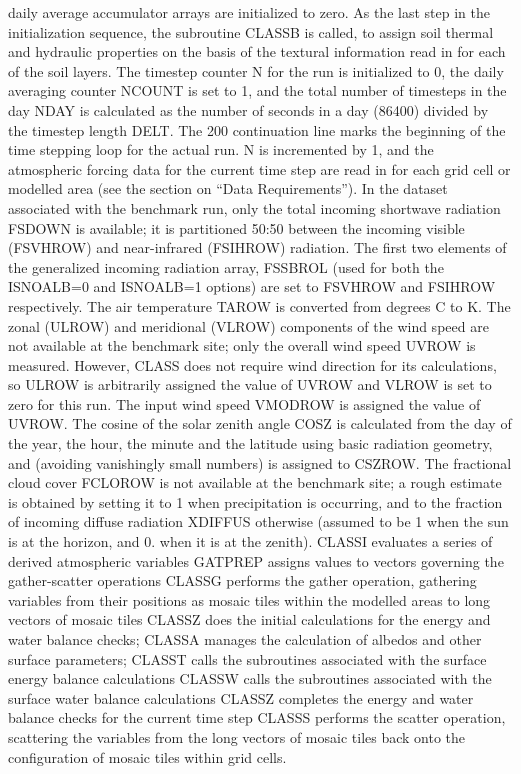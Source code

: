 daily average accumulator arrays are initialized to zero. As the last step in the initialization sequence, the subroutine C\+L\+A\+S\+S\+B is called, to assign soil thermal and hydraulic properties on the basis of the textural information read in for each of the soil layers. The timestep counter N for the run is initialized to 0, the daily averaging counter N\+C\+O\+U\+N\+T is set to 1, and the total number of timesteps in the day N\+D\+A\+Y is calculated as the number of seconds in a day (86400) divided by the timestep length D\+E\+L\+T. The 200 continuation line marks the beginning of the time stepping loop for the actual run. N is incremented by 1, and the atmospheric forcing data for the current time step are read in for each grid cell or modelled area (see the section on “\+Data Requirements”). In the dataset associated with the benchmark run, only the total incoming shortwave radiation F\+S\+D\+O\+W\+N is available; it is partitioned 50\+:50 between the incoming visible (F\+S\+V\+H\+R\+O\+W) and near-\/infrared (F\+S\+I\+H\+R\+O\+W) radiation. The first two elements of the generalized incoming radiation array, F\+S\+S\+B\+R\+O\+L (used for both the I\+S\+N\+O\+A\+L\+B=0 and I\+S\+N\+O\+A\+L\+B=1 options) are set to F\+S\+V\+H\+R\+O\+W and F\+S\+I\+H\+R\+O\+W respectively. The air temperature T\+A\+R\+O\+W is converted from degrees C to K. The zonal (U\+L\+R\+O\+W) and meridional (V\+L\+R\+O\+W) components of the wind speed are not available at the benchmark site; only the overall wind speed U\+V\+R\+O\+W is measured. However, C\+L\+A\+S\+S does not require wind direction for its calculations, so U\+L\+R\+O\+W is arbitrarily assigned the value of U\+V\+R\+O\+W and V\+L\+R\+O\+W is set to zero for this run. The input wind speed V\+M\+O\+D\+R\+O\+W is assigned the value of U\+V\+R\+O\+W. The cosine of the solar zenith angle C\+O\+S\+Z is calculated from the day of the year, the hour, the minute and the latitude using basic radiation geometry, and (avoiding vanishingly small numbers) is assigned to C\+S\+Z\+R\+O\+W. The fractional cloud cover F\+C\+L\+O\+R\+O\+W is not available at the benchmark site; a rough estimate is obtained by setting it to 1 when precipitation is occurring, and to the fraction of incoming diffuse radiation X\+D\+I\+F\+F\+U\+S otherwise (assumed to be 1 when the sun is at the horizon, and 0. when it is at the zenith). C\+L\+A\+S\+S\+I evaluates a series of derived atmospheric variables G\+A\+T\+P\+R\+E\+P assigns values to vectors governing the gather-\/scatter operations C\+L\+A\+S\+S\+G performs the gather operation, gathering variables from their positions as mosaic tiles within the modelled areas to long vectors of mosaic tiles C\+L\+A\+S\+S\+Z does the initial calculations for the energy and water balance checks; C\+L\+A\+S\+S\+A manages the calculation of albedos and other surface parameters; C\+L\+A\+S\+S\+T calls the subroutines associated with the surface energy balance calculations C\+L\+A\+S\+S\+W calls the subroutines associated with the surface water balance calculations C\+L\+A\+S\+S\+Z completes the energy and water balance checks for the current time step C\+L\+A\+S\+S\+S performs the scatter operation, scattering the variables from the long vectors of mosaic tiles back onto the configuration of mosaic tiles within grid cells. 